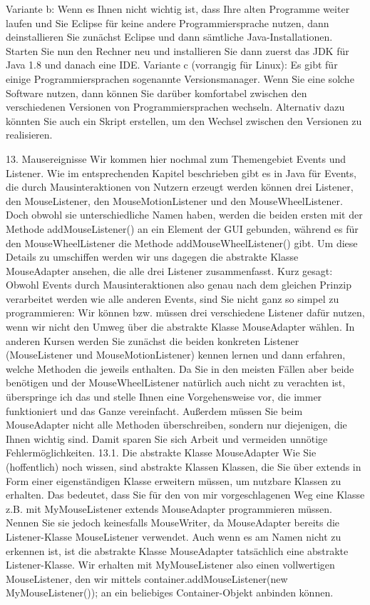 Variante b: Wenn es Ihnen nicht wichtig ist, dass Ihre alten Programme weiter laufen und Sie Eclipse für keine andere Programmiersprache nutzen, dann deinstallieren Sie zunächst Eclipse und dann sämtliche Java-Installationen. Starten Sie nun den Rechner neu und installieren Sie dann zuerst das JDK für Java 1.8 und danach eine IDE.
Variante c (vorrangig für Linux): Es gibt für einige Programmiersprachen sogenannte Versionsmanager. Wenn Sie eine solche Software nutzen, dann können Sie darüber komfortabel zwischen den verschiedenen Versionen von Programmiersprachen wechseln. Alternativ dazu könnten Sie auch ein Skript erstellen, um den Wechsel zwischen den Versionen zu realisieren.


13.	Mausereignisse
Wir kommen hier nochmal zum Themengebiet Events und Listener. Wie im entsprechenden Kapitel beschrieben gibt es in Java für Events, die durch Mausinteraktionen von Nutzern erzeugt werden können drei Listener, den MouseListener, den MouseMotionListener und den MouseWheelListener. Doch obwohl sie unterschiedliche Namen haben, werden die beiden ersten mit der Methode addMouseListener() an ein Element der GUI gebunden, während es für den MouseWheelListener die Methode addMouseWheelListener() gibt. Um diese Details zu umschiffen werden wir uns dagegen die abstrakte Klasse MouseAdapter ansehen, die alle drei Listener zusammenfasst.
Kurz gesagt: Obwohl Events durch Mausinteraktionen also genau nach dem gleichen Prinzip verarbeitet werden wie alle anderen Events, sind Sie nicht ganz so simpel zu programmieren: Wir können bzw. müssen drei verschiedene Listener dafür nutzen, wenn wir nicht den Umweg über die abstrakte Klasse MouseAdapter wählen.
In anderen Kursen werden Sie zunächst die beiden konkreten Listener (MouseListener und MouseMotionListener) kennen lernen und dann erfahren, welche Methoden die jeweils enthalten. Da Sie in den meisten Fällen aber beide benötigen und der MouseWheelListener natürlich auch nicht zu verachten ist, überspringe ich das und stelle Ihnen eine Vorgehensweise vor, die immer funktioniert und das Ganze vereinfacht. Außerdem müssen Sie beim MouseAdapter nicht alle Methoden überschreiben, sondern nur diejenigen, die Ihnen wichtig sind. Damit sparen Sie sich Arbeit und vermeiden unnötige Fehlermöglichkeiten.
13.1.	Die abstrakte Klasse MouseAdapter
Wie Sie (hoffentlich) noch wissen, sind abstrakte Klassen Klassen, die Sie über extends in Form einer eigenständigen Klasse erweitern müssen, um nutzbare Klassen zu erhalten.
Das bedeutet, dass Sie für den von mir vorgeschlagenen Weg eine Klasse z.B. mit MyMouseListener extends MouseAdapter programmieren müssen. Nennen Sie sie jedoch keinesfalls MouseWriter, da MouseAdapter bereits die Listener-Klasse MouseListener verwendet. Auch wenn es am Namen nicht zu erkennen ist, ist die abstrakte Klasse MouseAdapter tatsächlich eine abstrakte Listener-Klasse. Wir erhalten mit MyMouseListener also einen vollwertigen MouseListener, den wir mittels container.addMouseListener(new MyMouseListener()); an ein beliebiges Container-Objekt anbinden können.
